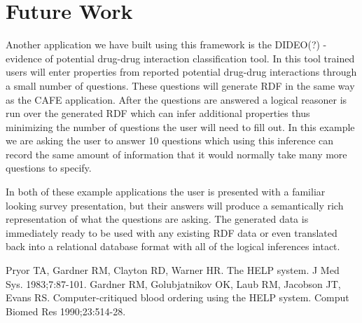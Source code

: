 \documentclass{amia}
\begin{document}
\section*{Future Work}
Another application we have built using this framework is the DIDEO(?) - evidence of potential drug-drug interaction classification tool.
In this tool trained users will enter properties from reported potential drug-drug interactions through a small number of questions.
These questions will generate RDF in the same way as the CAFE application.
After the questions are answered a logical reasoner is run over the generated RDF which can infer additional properties thus minimizing the number of questions the user will need to fill out.
In this example we are asking the user to answer 10 questions which using this inference can record the same amount of information that it would normally take many more questions to specify.

In both of these example applications the user is presented with a familiar looking survey presentation, but their answers will produce a semantically rich representation of what the questions are asking.  The generated data is immediately ready to be used with any existing RDF data or even translated back into a relational database format with all of the logical inferences intact.


\makeatletter
\renewcommand{\@biblabel}[1]{\hfill #1.}
\makeatother


\begin{thebibliography}{1}
\setlength\itemsep{-0.1em}

Pryor TA, Gardner RM, Clayton RD, Warner HR. The HELP system. J Med Sys. 1983;7:87-101.
Gardner RM, Golubjatnikov OK, Laub RM, Jacobson JT, Evans RS. Computer-critiqued blood ordering using the HELP system. Comput Biomed Res 1990;23:514-28.

\end{thebibliography}
\end{document}
